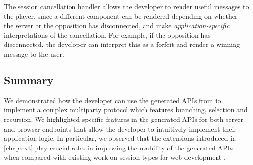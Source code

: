 The session cancellation handler allows the developer
to render useful messages to the player, since
a different component can be rendered depending on whether
the server or the opposition has disconnected,
and make \textit{application-specific} interpretations of the cancellation.
For example, if the opposition has disconnected,
the developer can interpret this as a forfeit and
render a winning message to the user.

\subsection{Summary}
We demonstrated how the developer can use the generated APIs
from \codegen to implement a complex multiparty protocol
which features branching, selection and recursion.
We highlighted specific features in the generated APIs for both
server and browser endpoints that allow the developer
to intuitively implement their application logic.
In particular, we observed that the extensions introduced
in \cref{chap:ext} play crucial roles in
improving the usability of the generated APIs when
compared with existing work on session types for web development 
\cite{PureScript2019,MVU2020,LINKS}.